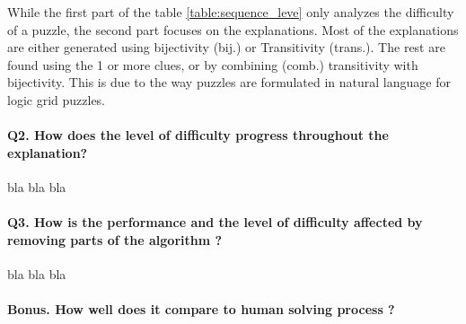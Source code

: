 While the first part of the table \ref{table:sequence_leve} only analyzes the difficulty of a puzzle, the second part focuses on the explanations. 
Most of the explanations are either generated using bijectivity (bij.) or Transitivity (trans.). The rest are found using the 1 or more clues, or by combining (comb.) transitivity with bijectivity. This is due to the way puzzles are formulated in natural language for logic grid puzzles.

\paragraph{Q2. How does the level of difficulty progress throughout the explanation?} bla bla bla


\paragraph{Q3. How is the performance and the level of difficulty affected by removing parts of the algorithm ? } bla bla bla


\paragraph{Bonus. How well does it compare to human solving process ?} 


